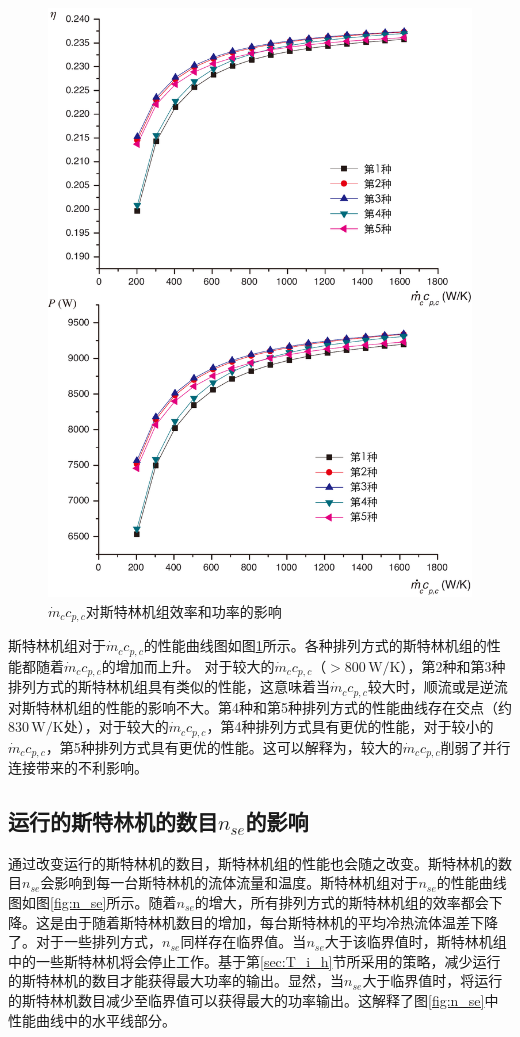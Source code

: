 \noindent \begin{figure}[htbp]
\begin{center}
	\includegraphics[width = 0.7\columnwidth]{fig/qm_ccp_c}
	\caption{$\dot{m}_cc_{p,c}$对斯特林机组效率和功率的影响}
	\label{fig:qm_ccp_c}
\end{center}
\end{figure}

斯特林机组对于$\dot{m}_cc_{p,c}$的性能曲线图如图\ref{fig:qm_ccp_c}所示。各种排列方式的斯特林机组的性能都随着$\dot{m}_cc_{p,c}$的增加而上升。
对于较大的$\dot{m}_cc_{p,c}$（$> 800\,\mathrm{W/K}$），第2种和第3种排列方式的斯特林机组具有类似的性能，这意味着当$\dot{m}_cc_{p,c}$较大时，顺流或是逆流对斯特林机组的性能的影响不大。第4种和第5种排列方式的性能曲线存在交点（约$830\,\mathrm{W/K}$处），对于较大的$\dot{m}_cc_{p,c}$，第4种排列方式具有更优的性能，对于较小的$\dot{m}_cc_{p,c}$，第5种排列方式具有更优的性能。这可以解释为，较大的$\dot{m}_cc_{p,c}$削弱了并行连接带来的不利影响。

\subsection{运行的斯特林机的数目$n_{se}$的影响}

通过改变运行的斯特林机的数目，斯特林机组的性能也会随之改变。斯特林机的数目$n_{se}$会影响到每一台斯特林机的流体流量和温度。斯特林机组对于$n_{se}$的性能曲线图如图\ref{fig:n_se}所示。随着$n_{se}$的增大，所有排列方式的斯特林机组的效率都会下降。这是由于随着斯特林机数目的增加，每台斯特林机的平均冷热流体温差下降了。对于一些排列方式，$n_{se}$同样存在临界值。当$n_{se}$大于该临界值时，斯特林机组中的一些斯特林机将会停止工作。基于第\ref{sec:T_i_h}节所采用的策略，减少运行的斯特林机的数目才能获得最大功率的输出。显然，当$n_{se}$大于临界值时，将运行的斯特林机数目减少至临界值可以获得最大的功率输出。这解释了图\ref{fig:n_se}中性能曲线中的水平线部分。

